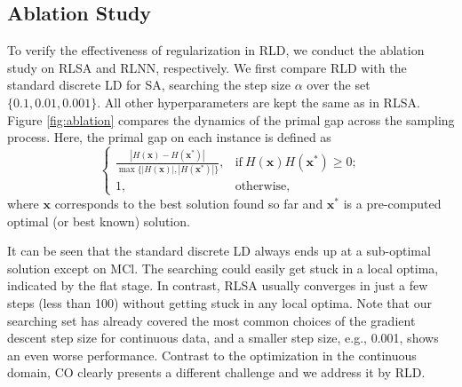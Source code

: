 \subsection{Ablation Study}
To verify the effectiveness of regularization in RLD, we conduct the ablation study on RLSA and RLNN, respectively. We first compare RLD with the standard discrete LD  \citep{zhang2022langevinlike} for SA, searching the step size $\alpha$ over the set $\{ 0.1, 0.01, 0.001\}$. All other hyperparameters are kept the same as in RLSA. Figure \ref{fig:ablation} compares the dynamics of the primal gap \citep{Berthold2014HeuristicAI} across the sampling process. Here, the primal gap on each instance is defined as
\begin{equation}
\begin{cases}
        \frac{|H(\mathbf{x})-H(\mathbf{x}^*)|}{\max\{|H(\mathbf{x})|,|H(\mathbf{x}^*)|\}}, & \text{if} \ H(\mathbf{x})H(\mathbf{x}^*)\geq0; \\
        1, & \text{otherwise},
    \end{cases}
\end{equation}
where $\mathbf{x}$ corresponds to the best solution found so far and $\mathbf{x}^*$ is a pre-computed optimal (or best known) solution. 

It can be seen that the standard discrete LD always ends up at a sub-optimal solution except on MCl. The searching could easily get stuck in a local optima, indicated by the flat stage. In contrast, RLSA usually converges in just a few steps (less than 100) without getting stuck in any local optima. Note that our searching set has already covered the most common choices of the gradient descent step size for continuous data, and a smaller step size, e.g., 0.001, shows an even worse performance. Contrast to the optimization in the continuous domain, CO clearly presents a different challenge and we address it by RLD.


